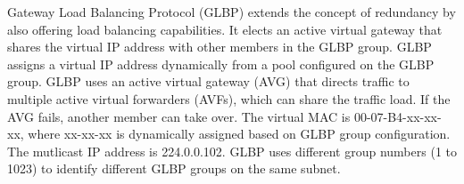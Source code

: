 \documentclass{article}
\begin{document}
\begin{itemize}
	Gateway Load Balancing Protocol (GLBP) extends the concept of redundancy by also offering load balancing capabilities. It elects an active virtual gateway that shares the virtual IP address with other members in the GLBP group. GLBP assigns a virtual IP address dynamically from a pool configured on the GLBP group. GLBP uses an active virtual gateway (AVG) that directs traffic to multiple active virtual forwarders (AVFs), which can share the traffic load. If the AVG fails, another member can take over. The virtual MAC is 00-07-B4-xx-xx-xx, where xx-xx-xx is dynamically assigned based on GLBP group configuration. The mutlicast IP address is 224.0.0.102. GLBP uses different group numbers (1 to 1023) to identify different GLBP groups on the same subnet.
\end{itemize}
\end{document}
